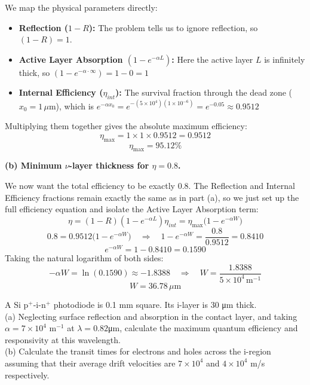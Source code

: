 We map the physical parameters directly:
\begin{itemize}
  \item \textbf{Reflection ($1-R$):} The problem tells us to ignore reflection, so $(1 - R) = 1$.
  \item \textbf{Active Layer Absorption $(1 - e^{-\alpha L})$:} Here the active layer $L$ is infinitely thick, so $(1 - e^{-\alpha \cdot \infty}) = 1 - 0 = 1$
  \item \textbf{Internal Efficiency ($\eta_{int}$):} The survival fraction through the dead zone ($x_0 = 1\,\mu\text{m}$), which is $e^{-\alpha x_0} = e^{-(5\times10^4)(1\times10^{-6})} = e^{-0.05} \approx 0.9512$
\end{itemize}
Multiplying them together gives the absolute maximum efficiency:
\begin{equation*}
  \eta_{\max} = 1 \times 1 \times 0.9512 = 0.9512
\end{equation*}
\begin{equation*}
  \boxed{\eta_{\max} = 95.12\%}
\end{equation*}

\textbf{(b) Minimum $\nu$-layer thickness for $\eta = 0.8$.}

We now want the total efficiency to be exactly $0.8$. The Reflection and Internal Efficiency fractions remain exactly the same as in part (a), so we just set up the full efficiency equation and isolate the Active Layer Absorption term:
\begin{equation*}
  \eta = (1-R)(1 - e^{-\alpha L})\eta_{int} = \eta_{\max} \bigl(1 - e^{-\alpha W}\bigr)
\end{equation*}
\begin{equation*}
  0.8 = 0.9512 \bigl(1 - e^{-\alpha W}\bigr) \quad\Longrightarrow\quad 1 - e^{-\alpha W} = \frac{0.8}{0.9512} = 0.8410
\end{equation*}
\begin{equation*}
  e^{-\alpha W} = 1 - 0.8410 = 0.1590
\end{equation*}
Taking the natural logarithm of both sides:
\begin{equation*}
  -\alpha W = \ln(0.1590) \approx -1.8388 \quad\Longrightarrow\quad W = \frac{1.8388}{5\times10^4\,\text{m}^{-1}}
\end{equation*}
\begin{equation*}
  \boxed{W = 36.78\,\mu\text{m}}
\end{equation*}



\begin{question}[Question 8]
A Si p$^+$-i-n$^+$ photodiode is 0.1 mm square. Its i-layer is 30 \si{\micro\meter} thick.\\
(a) Neglecting surface reflection and absorption in the contact layer, and taking $\alpha = 7\times 10^4$ m$^{-1}$ at $\lambda=0.82$\si{\micro\meter}, calculate the maximum quantum efficiency and responsivity at this wavelength.\\
(b) Calculate the transit times for electrons and holes across the i-region assuming that their average drift velocities are $7\times 10^4$ and $4\times 10^4$ m/s respectively.
\end{question}

